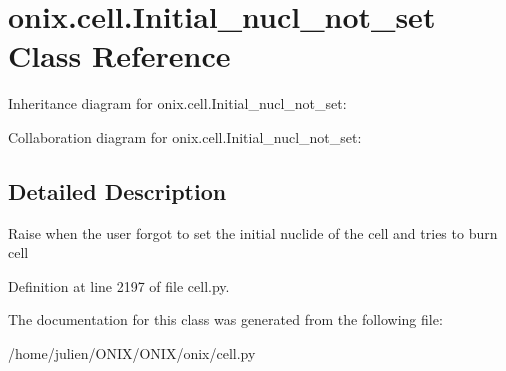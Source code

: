 \hypertarget{classonix_1_1cell_1_1Initial__nucl__not__set}{}\section{onix.\+cell.\+Initial\+\_\+nucl\+\_\+not\+\_\+set Class Reference}
\label{classonix_1_1cell_1_1Initial__nucl__not__set}


Inheritance diagram for onix.\+cell.\+Initial\+\_\+nucl\+\_\+not\+\_\+set\+:


Collaboration diagram for onix.\+cell.\+Initial\+\_\+nucl\+\_\+not\+\_\+set\+:


\subsection{Detailed Description}
\begin{DoxyVerb}Raise when the user forgot to set the initial nuclide of the cell and tries to burn cell\end{DoxyVerb}
 

Definition at line 2197 of file cell.\+py.



The documentation for this class was generated from the following file\+:\begin{DoxyCompactItemize}
\item 
/home/julien/\+O\+N\+I\+X/\+O\+N\+I\+X/onix/cell.\+py\end{DoxyCompactItemize}
